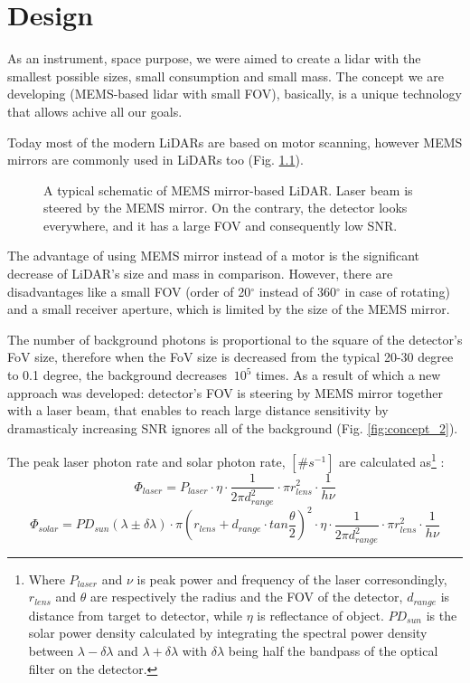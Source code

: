 \chapter{Design}

As an instrument, space purpose, we were aimed to create a lidar with the smallest possible sizes, small consumption and small mass.
The concept we are developing (MEMS-based lidar with small FOV), basically, is a unique technology that allows achive all our goals.

Today most of the modern LiDARs are based on motor scanning, however MEMS mirrors are commonly used in LiDARs too (Fig. \ref{fig:concept_1}).

\begin{figure}[h]
\caption{A typical schematic of MEMS mirror-based LiDAR. Laser beam is steered by the MEMS mirror. On the contrary, the detector looks everywhere, and it has a large FOV and consequently low SNR.}
\label{fig:concept_1} 
\end{figure}

The advantage of using MEMS mirror instead of a motor is the significant decrease of LiDAR’s size and mass in comparison. However, there are disadvantages like a small FOV (order of 20$^\circ$ instead of 360$^\circ$ in case of rotating) and a small receiver aperture, which is limited by the size
of the MEMS mirror.


The number of background photons is proportional to the square of the detector’s FoV size, therefore when the FoV size is decreased from the typical 20-30 degree to 0.1 degree,
the background decreases $~10^5$ times.
As a result of which a new approach was developed: detector's FOV is steering by MEMS mirror together with a laser beam, that enables to reach large distance sensitivity by dramasticaly increasing SNR ignores all of the background (Fig. \ref{fig:concept_2}).

The peak laser photon rate and solar photon rate, $[\#s^{-1}]$ are calculated as\footnote{
Where $P_{laser}$ and $\nu$ is peak power and frequency of the laser corresondingly, $r_{lens}$ and $\theta$ are respectively the radius and the FOV of the detector, $d_{range}$ is distance from target to detector, while $\eta$ is reflectance of object. $PD_{sun}$ is the solar power density calculated by integrating the spectral power density between $\lambda - \delta\lambda$ and $\lambda + \delta\lambda$ with $\delta\lambda$ being half the bandpass of the optical filter on the detector.
}
:
\begin{equation}\label{eq:peak_power}
\Phi_{laser} = P_{laser} \cdot \eta \cdot \frac{1}{2\pi d_{range}^2} \cdot \pi r_{lens}^2 \cdot \frac{1}{h\nu}
\end{equation}
\vspace{-5mm}
\begin{equation}\label{eq:sun_noise}
\Phi_{solar} = PD_{sun}(\lambda \pm \delta \lambda) \cdot \pi (r_{lens}+d_{range} \cdot tan\frac{\theta}{2})^2 \cdot \eta \cdot \frac{1}{2\pi d_{range}^2} \cdot \pi r_{lens}^2 \cdot \frac{1}{h\nu}
\end{equation}

